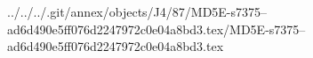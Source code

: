 ../../../.git/annex/objects/J4/87/MD5E-s7375--ad6d490e5ff076d2247972c0e04a8bd3.tex/MD5E-s7375--ad6d490e5ff076d2247972c0e04a8bd3.tex